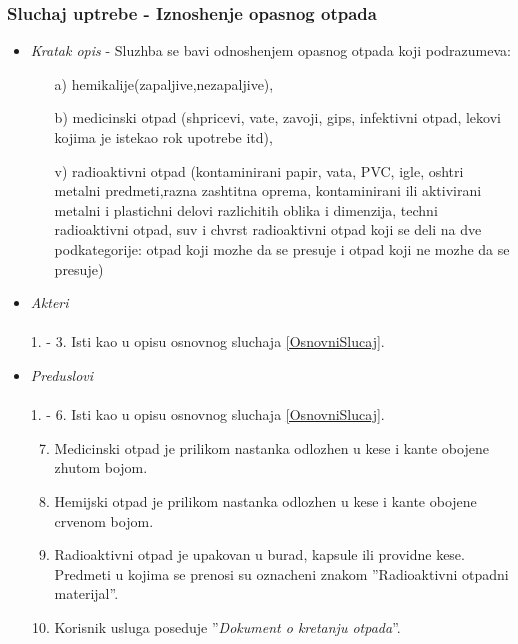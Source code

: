\documentclass[10 pt]{article}
\begin{document}
	\subsubsection{Sluchaj uptrebe - Iznoshenje opasnog otpada}
		
		\begin{itemize}
			
			\item\textit{Kratak opis} - Sluzhba se bavi odnoshenjem opasnog otpada koji podrazumeva: 
				\begin{enumerate}
					\item[a)] hemikalije(zapaljive,nezapaljive),
					\item[b)] medicinski otpad (shpricevi, vate, zavoji, gips, infektivni otpad, lekovi kojima je istekao rok upotrebe itd),
					\item[v)] radioaktivni otpad (kontaminirani papir, vata, PVC, igle, oshtri metalni predmeti,razna zashtitna oprema, kontaminirani ili aktivirani metalni i plastichni delovi razlichitih oblika i dimenzija, techni radioaktivni otpad, suv i chvrst radioaktivni otpad koji se deli na  dve  podkategorije:
						otpad  koji  mozhe da se presuje i otpad koji ne mozhe da se presuje)
				\end{enumerate}
			
			
			\item\textit{Akteri}\\\\ 
				1. - 3. Isti kao u opisu osnovnog sluchaja \ref{OsnovniSlucaj}. 
					 
			\item\textit{Preduslovi}\\\\ 
				1. - 6. Isti kao u opisu osnovnog sluchaja \ref{OsnovniSlucaj}.
				\begin{enumerate}
					\setcounter{enumi}{6}
					\item Medicinski otpad je prilikom nastanka odlozhen u kese i kante obojene zhutom bojom.
					\item Hemijski otpad je prilikom nastanka odlozhen u kese i kante obojene crvenom bojom.
					\item Radioaktivni otpad je upakovan u burad, kapsule ili providne kese. Predmeti u kojima se prenosi su oznacheni znakom ''Radioaktivni otpadni materijal''.
					\item Korisnik usluga poseduje ''\textit{Dokument o kretanju otpada}''.
				\end{enumerate}
		

\end{itemize}
\end{document}
